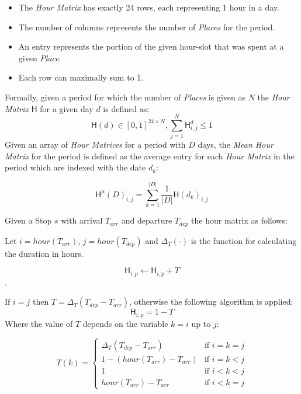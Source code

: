 \begin{itemize}
    \item The \textit{Hour Matrix} has exactly 24 rows, each representing 1 hour in a day.
    \item The number of columns represents the number of \textit{Places} for the period. 
    \item An entry represents the portion of the given hour-slot that was spent at a given \textit{Place}.
    \item Each row can maximally sum to 1.
\end{itemize}

Formally, given a period for which the number of \textit{Places} is given as $N$ the \textit{Hour Matrix} $\mathsf{H}$ for a given day $d$ is defined as:
$$\mathsf{H}(d) \in [0,1]^{24 \times N}, \sum_{j=1}^N \mathsf{H}^d_{i,j} \leq 1$$
Given an array of \textit{Hour Matrices} for a period with $D$ days, the \textit{Mean Hour Matrix} for the period is defined as the average entry for each \textit{Hour Matrix} in the period which are indexed with the date $d_k$:

$$\mathsf{H}^{\mu} (D) _{i,j} = \sum_{k=1}^{|D|} \frac{1}{|D|} \mathsf{H}(d_k)_{i,j}$$

Given a Stop $s$ with arrival $T_{arr}$ and departure $T_{dep}$ the hour matrix as follows:

Let $i = hour(T_{arr})$, $j = hour(T_{dep})$ and $\Delta_ T(\cdot)$ is the function for calculating the duration in hours.

$$\mathsf{H}_{i,p} \leftarrow \mathsf{H}_{i,p} + T$$. 

If $i = j$ then $T = \Delta_T (T_{dep} - T_{arr})$, otherwise the following algorithm is applied:\\

$$\mathsf{H}_{i,p} = 1 - T$$
Where the value of $T$ depends on the variable $k = i$ up to $j$:

\[
  T(k) =
  \begin{cases}
\Delta_T (T_{dep} - T_{arr})            & \text{if $i = k = j$} \\
1 - (hour(T_{arr}) - T_{arr}) & \text{if $i = k < j$} \\
1                                       & \text{if $i < k < j$} \\
hour(T_{arr}) - T_{arr}       & \text{if $i < k = j$}
  \end{cases}
\]

